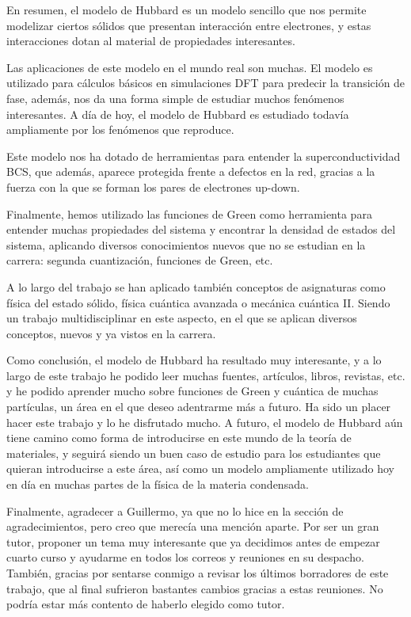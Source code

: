 \documentclass[12pt,twoside]{article}
\begin{document}
En resumen, el modelo de Hubbard es un modelo sencillo que nos permite modelizar ciertos sólidos que presentan interacción entre electrones, y estas interacciones dotan al material de propiedades interesantes.

Las aplicaciones de este modelo en el mundo real son muchas. El modelo es utilizado para cálculos básicos en simulaciones DFT para predecir la transición de fase, además, nos da una forma simple de estudiar muchos fenómenos interesantes. A día de hoy, el modelo de Hubbard es estudiado todavía ampliamente por los fenómenos que reproduce.

Este modelo nos ha dotado de herramientas para entender la superconductividad BCS, que además, aparece protegida frente a defectos en la red, gracias a la fuerza con la que se forman los pares de electrones up-down.

Finalmente, hemos utilizado las funciones de Green como herramienta para entender muchas propiedades del sistema y encontrar la densidad de estados del sistema, aplicando diversos conocimientos nuevos que no se estudian en la carrera: segunda cuantización, funciones de Green, etc.

A lo largo del trabajo se han aplicado también conceptos de asignaturas como física del estado sólido, física cuántica avanzada o mecánica cuántica II. Siendo un trabajo multidisciplinar en este aspecto, en el que se aplican diversos conceptos, nuevos y ya vistos en la carrera.

Como conclusión, el modelo de Hubbard ha resultado muy interesante, y a lo largo de este trabajo he podido leer muchas fuentes, artículos, libros, revistas, etc. y he podido aprender mucho sobre funciones de Green y cuántica de muchas partículas, un área en el que deseo adentrarme más a futuro. Ha sido un placer hacer este trabajo y lo he disfrutado mucho. A futuro, el modelo de Hubbard aún tiene camino como forma de introducirse en este mundo de la teoría de materiales, y seguirá siendo un buen caso de estudio para los estudiantes que quieran introducirse a este área, así como un modelo ampliamente utilizado hoy en día en muchas partes de la física de la materia condensada.

Finalmente, agradecer a Guillermo, ya que no lo hice en la sección de agradecimientos, pero creo que merecía una mención aparte. Por ser un gran tutor, proponer un tema muy interesante que ya decidimos antes de empezar cuarto curso y ayudarme en todos los correos y reuniones en su despacho. También, gracias por sentarse conmigo a revisar los últimos borradores de este trabajo, que al final sufrieron bastantes cambios gracias a estas reuniones. No podría estar más contento de haberlo elegido como tutor.
\newpage
{}

\printbibliography
\end{document}
